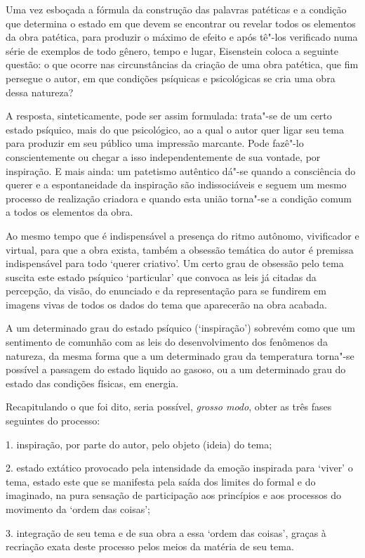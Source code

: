 Uma vez esboçada a fórmula da construção das palavras patéticas e a
condição que determina o estado em que devem se encontrar ou revelar
todos os elementos da obra patética, para produzir o máximo de efeito e
após tê"-los verificado numa série de exemplos de todo gênero, tempo e
lugar, Eisenstein coloca a seguinte questão: o que ocorre nas
circunstâncias da criação de uma obra patética, que fim persegue o
autor, em que condições psíquicas e psicológicas se cria uma obra dessa
natureza?

A resposta, sinteticamente, pode ser assim formulada: trata"-se de um
certo estado psíquico, mais do que psicológico, ao a qual o autor quer
ligar seu tema para produzir em seu público uma impressão marcante. Pode
fazê"-lo conscientemente ou chegar a isso independentemente de sua
vontade, por inspiração. E mais ainda: um patetismo autêntico dá"-se
quando a consciência do querer e a espontaneidade da inspiração são
indissociáveis e seguem um mesmo processo de realização criadora e
quando esta união torna"-se a condição comum a todos os elementos da
obra.

Ao mesmo tempo que é indispensável a presença do ritmo autônomo,
vivificador e virtual, para que a obra exista, também a obsessão
temática do autor é premissa indispensável para todo `querer criativo'.
Um certo grau de obsessão pelo tema suscita este estado psíquico
`particular' que convoca as leis já citadas da percepção, da visão, do
enunciado e da representação para se fundirem em imagens vivas de todos
os dados do tema que aparecerão na obra acabada.

A um determinado grau do estado psíquico (`inspiração') sobrevém como
que um sentimento de comunhão com as leis do desenvolvimento dos
fenômenos da natureza, da mesma forma que a um determinado grau da
temperatura torna"-se possível a passagem do estado liquido ao gasoso, ou
a um determinado grau do estado das condições físicas, em energia.

Recapitulando o que foi dito, seria possível, \emph{grosso modo}, obter
as três fases seguintes do processo:

1. inspiração, por parte do autor, pelo objeto (ideia) do tema;

2. estado extático provocado pela intensidade da emoção inspirada para
`viver' o tema, estado este que se manifesta pela saída dos limites do
formal e do imaginado, na pura sensação de participação aos princípios e
aos processos do movimento da `ordem das coisas';

3. integração de seu tema e de sua obra a essa `ordem das coisas',
graças à recriação exata deste processo pelos meios da matéria de seu
tema.

